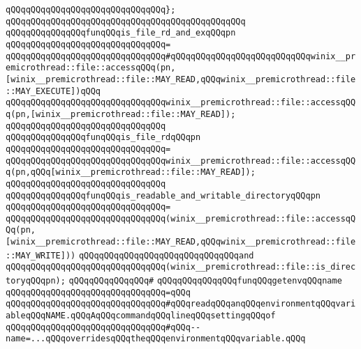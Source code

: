 \verb|qQQqqQQqqQQqqQQqqQQqqQQqqQQqqQQq};|\newline
\verb|qQQqqQQqqQQqqQQqqQQqqQQqqQQqqQQqqQQqqQQqqQQqqQQq|\newline
\verb|qQQqqQQqqQQqqQQqfunqQQqis_file_rd_and_exqQQqpn|\newline
\verb|qQQqqQQqqQQqqQQqqQQqqQQqqQQqqQQq=|\newline
\verb|qQQqqQQqqQQqqQQqqQQqqQQqqQQqqQQq#qQQqqQQqqQQqqQQqqQQqqQQqqQQqwinix__premicrothread::file::accessqQQq(pn,[winix__premicrothread::file::MAY_READ,qQQqwinix__premicrothread::file::MAY_EXECUTE])qQQq|\newline
\verb|qQQqqQQqqQQqqQQqqQQqqQQqqQQqqQQqwinix__premicrothread::file::accessqQQq(pn,[winix__premicrothread::file::MAY_READ]);|\newline
\verb|qQQqqQQqqQQqqQQqqQQqqQQqqQQqqQQq|\newline
\verb|qQQqqQQqqQQqqQQqfunqQQqis_file_rdqQQqpn|\newline
\verb|qQQqqQQqqQQqqQQqqQQqqQQqqQQqqQQq=|\newline
\verb|qQQqqQQqqQQqqQQqqQQqqQQqqQQqqQQqwinix__premicrothread::file::accessqQQq(pn,qQQq[winix__premicrothread::file::MAY_READ]);|\newline
\verb|qQQqqQQqqQQqqQQqqQQqqQQqqQQqqQQq|\newline
\verb|qQQqqQQqqQQqqQQqfunqQQqis_readable_and_writable_directoryqQQqpn|\newline
\verb|qQQqqQQqqQQqqQQqqQQqqQQqqQQqqQQq=|\newline
\verb|qQQqqQQqqQQqqQQqqQQqqQQqqQQqqQQq(winix__premicrothread::file::accessqQQq(pn,[winix__premicrothread::file::MAY_READ,qQQqwinix__premicrothread::file::MAY_WRITE]))|\newline
\verb|qQQqqQQqqQQqqQQqqQQqqQQqqQQqqQQqand|\newline
\verb|qQQqqQQqqQQqqQQqqQQqqQQqqQQqqQQq(winix__premicrothread::file::is_directoryqQQqpn);|\newline
\verb|qQQqqQQqqQQqqQQq#|\newline
\verb|qQQqqQQqqQQqqQQqfunqQQqgetenvqQQqname|\newline
\verb|qQQqqQQqqQQqqQQqqQQqqQQqqQQqqQQq=qQQq|\newline
\verb|qQQqqQQqqQQqqQQqqQQqqQQqqQQqqQQq#qQQqreadqQQqanqQQqenvironmentqQQqvariableqQQqNAME.qQQqAqQQqcommandqQQqlineqQQqsettingqQQqof|\newline
\verb|qQQqqQQqqQQqqQQqqQQqqQQqqQQqqQQq#qQQq--name=...qQQqoverridesqQQqtheqQQqenvironmentqQQqvariable.qQQq|\newline
\newline
